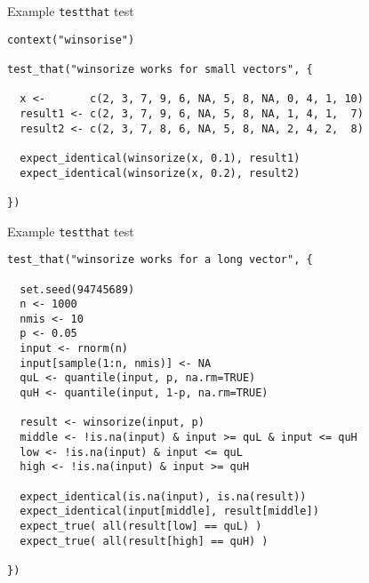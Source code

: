 \documentclass[12pt,t]{beamer}
\begin{document}
\begin{frame}[c,fragile]{Example {\tt testthat} test}


\begin{lstlisting}
context("winsorise")

test_that("winsorize works for small vectors", {

  x <-       c(2, 3, 7, 9, 6, NA, 5, 8, NA, 0, 4, 1, 10)
  result1 <- c(2, 3, 7, 9, 6, NA, 5, 8, NA, 1, 4, 1,  7)
  result2 <- c(2, 3, 7, 8, 6, NA, 5, 8, NA, 2, 4, 2,  8)

  expect_identical(winsorize(x, 0.1), result1)
  expect_identical(winsorize(x, 0.2), result2)

})
\end{lstlisting}



\end{frame}


\begin{frame}[c,fragile]{Example {\tt testthat} test}


\begin{lstlisting}
test_that("winsorize works for a long vector", {

  set.seed(94745689)
  n <- 1000
  nmis <- 10
  p <- 0.05
  input <- rnorm(n)
  input[sample(1:n, nmis)] <- NA
  quL <- quantile(input, p, na.rm=TRUE)
  quH <- quantile(input, 1-p, na.rm=TRUE)

  result <- winsorize(input, p)
  middle <- !is.na(input) & input >= quL & input <= quH
  low <- !is.na(input) & input <= quL
  high <- !is.na(input) & input >= quH

  expect_identical(is.na(input), is.na(result))
  expect_identical(input[middle], result[middle])
  expect_true( all(result[low] == quL) )
  expect_true( all(result[high] == quH) )

})
\end{lstlisting}



\end{frame}
\end{document}
